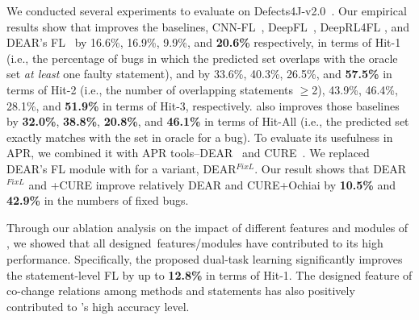 We conducted several experiments to evaluate {\tool} on
Defects4J-v2.0~\cite{defects4j}. Our empirical results show that
{\tool} improves the baselines, CNN-FL~\cite{zhang2019cnn},
DeepFL~\cite{DeepFL}, DeepRL4FL \cite{icse21-fl}, and DEAR's FL~\cite{icse22} by 16.6\%, 16.9\%, 9.9\%, and {\bf 20.6\%} respectively, in terms of Hit-1 (i.e., the percentage of bugs in which
the predicted set overlaps with the oracle set {\em at least} one
faulty statement), and by 33.6\%, 40.3\%, 26.5\%, and {\bf 57.5\%} in
terms of Hit-2 (i.e., the number of overlapping statements $\geq$2),
43.9\%, 46.4\%, 28.1\%, and {\bf 51.9\%} in terms of Hit-3, respectively.
{\tool} also improves those baselines by {\bf 32.0\%}, {\bf
  38.8\%}, {\bf 20.8\%}, and {\bf 46.1\%} in terms of Hit-All (i.e.,
the predicted set exactly matches with the set in oracle for a bug).
%
%
To evaluate its usefulness in APR, we combined it with APR tools--DEAR~\cite{icse22} and CURE~\cite{cure-icse21}. We replaced DEAR's FL module with {\tool} for a variant, DEAR$^{FixL}$. Our result shows that DEAR$^{FixL}$ and {\tool}+CURE improve relatively DEAR and CURE+Ochiai \cite{icse22} by {\bf 10.5\%} and {\bf 42.9\%} in the numbers of fixed bugs.



Through our ablation analysis on the impact of different features and
modules of {\tool}, we showed that all designed~features/modules have
contributed to its high performance. Specifically, the proposed
dual-task learning significantly improves the statement-level FL by up
to {\bf 12.8\%} in terms of Hit-1. The designed feature of co-change
relations among methods and statements has also positively contributed to
{\tool}'s high accuracy level.


